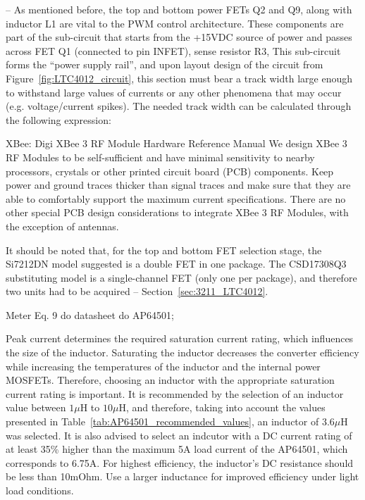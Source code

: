-- As mentioned before, the top and bottom power FETs Q2 and Q9, along with inductor L1 are vital to the PWM control architecture. These components are part of the sub-circuit that starts from the +15VDC source of power and passes across FET Q1 (connected to pin INFET), sense resistor R3, 
This sub-circuit forms the ``power supply rail'', and upon layout design of the circuit from Figure~\ref{fig:LTC4012_circuit}, this section must bear a track width large enough to withstand large values of currents or any other phenomena that may occur (e.g. voltage/current spikes). The needed track width can be calculated through the following expression:

XBee: Digi XBee 3 RF Module Hardware Reference Manual
We design XBee 3 RF Modules to be self-sufficient and have minimal sensitivity to nearby processors,
crystals or other printed circuit board (PCB) components. Keep power and ground traces thicker than
signal traces and make sure that they are able to comfortably support the maximum current
specifications. There are no other special PCB design considerations to integrate XBee 3 RF Modules,
with the exception of antennas.




It should be noted that, for the top and bottom FET selection stage, the Si7212DN model suggested is a double FET in one package. The CSD17308Q3 substituting model is a single-channel FET (only one per package), and therefore two units had to be acquired -- Section~\ref{sec:3211_LTC4012}.




    Meter Eq. 9 do datasheet do AP64501;
    
    Peak current determines the required saturation current rating, which influences the size of the inductor. Saturating the inductor decreases the converter efficiency while increasing the temperatures of the inductor and the internal power MOSFETs. Therefore, choosing an inductor with the appropriate saturation current rating is important. 
    It is recommended by \cite{AP64501} the selection of an inductor value between $1 \mu$H to $10 \mu$H, and therefore, taking into account the values presented in Table~\ref{tab:AP64501_recommended_values}, an inductor of $3.6 \mu$H was selected. It is also advised to select an indcutor with a DC current rating of at least 35\% higher than the maximum 5A load current of the AP64501, which corresponds to 6.75A.
    For highest efficiency, the inductor's DC resistance should be less than 10mOhm. Use a larger inductance for improved efficiency under light load conditions.


